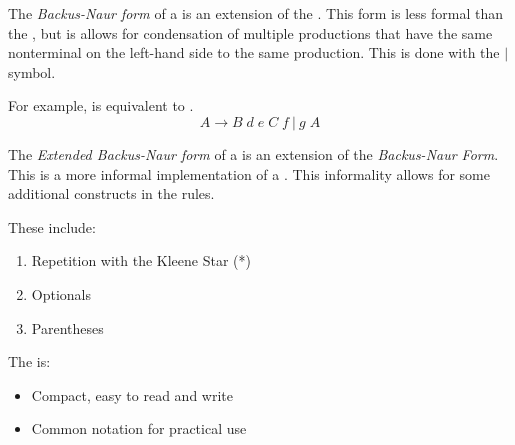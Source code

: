 \begin{definition}\label{def:CFG_BNF_Form}
  The \emph{Backus-Naur form} of a  is an extension of the .
  This form is less formal than the , but is allows for condensation of multiple productions that have the same nonterminal on the left-hand side to the same production.
  This is done with the $\vert$ symbol.

  For example,  is equivalent to .
  \begin{equation}\label{eq:CFG_BNF_Form}
    A \rightarrow B \; d \; e \; C \; f \: \vert \: g\; A
  \end{equation}
\end{definition}

\begin{definition}\label{def:CFG_EBNF_Form}
  The \emph{Extended Backus-Naur form} of a  is an extension of the \emph{Backus-Naur Form}.
  This is a more informal implementation of a .
  This informality allows for some additional constructs in the  rules.

  These include:
  \begin{enumerate}[noitemsep]

  \item Repetition with the Kleene Star (*)
  \item Optionals
  \item Parentheses
  \end{enumerate}

  The  is:
  \begin{itemize}[noitemsep]
  \item Compact, easy to read and write
  \item Common notation for practical use
  \end{itemize}
\end{definition}

